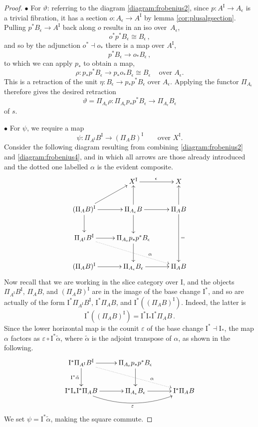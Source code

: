 \documentclass[12pt]{article}
\newcommand{\ra}{\ensuremath{\rightarrow}}
\newcommand{\I}{\ensuremath{\mathrm{I}}}
\theoremstyle{remark}
\theoremstyle{definition}
\begin{document}
\begin{proof}
\noindent $\bullet$ For $\vartheta$: referring to the diagram \eqref{diagram:frobenius2}, since $p : A^\I \ra A_\epsilon$ is a trivial fibration, it has a section $o :  A_\epsilon \ra A^\I$ by lemma \ref{cor:plusalgsection}.  Pulling  $p^*B_\epsilon \ra A^\I$ back along $o$ results in an iso over~$A_\epsilon$,
\[
o^*p^* B_\epsilon \cong B_\epsilon \,,
\]
and so by the adjunction $o^*\!\dashv o_*$ there is a map over $A^\I$,
\[
p^* B_\epsilon \ra o_* B_\epsilon \,,
\]
to which we can apply $p_*$ to obtain a map,
\[
\rho : p_*p^* B_\epsilon \ra p_*o_*B_\epsilon \cong B_\epsilon\,\quad \text{over $A_\epsilon$.}
\]
This is a retraction of the unit $\eta : B_\epsilon \ra p_*p^* B_\epsilon$ over $A_\epsilon$.  Applying the functor $ \Pi_{A_\epsilon}$ therefore gives the desired retraction $$\vartheta = \Pi_{A_\epsilon}\rho :  \Pi_{A_\epsilon}p_*p^* B_\epsilon \ra \Pi_{A_\epsilon}B_\epsilon$$ of $s$.

\medskip
\noindent $\bullet$ For $\psi$, we require a map 
\[
\psi:\Pi_{A^\I}B^\I \ra (\Pi_AB)^\I \qquad \text{over $X^\I$.}
\]
Consider the following diagram resulting from combining \eqref{diagram:frobenius2} and \eqref{diagram:frobenius4}, and in which all arrows are those already introduced and the dotted one labelled $\alpha$ is the evident composite.
\begin{equation}\label{diagram:frobenius8}
\xymatrix{
& X^\I \ar[r]^\epsilon & X \\
 (\Pi_AB)^\I  \ar[r]  \ar[ru] \ar[d] & \Pi_{A_\epsilon}B  \ar[u] \ar[d] \ar[r] & \Pi_{A}B \ar[u]\ar[dd]^= \\
 \Pi_{A^\I}B^\I \ar[r] \ar@{..>}[rrd]^>>>>>>>>>>>\alpha & \Pi_{A_\epsilon} p_*p^* B_\epsilon \ar[d] & \\
  (\Pi_AB)^\I  \ar[r]  & \Pi_{A_\epsilon}B_\epsilon \ar[r] & \Pi_{A}B 
}
\end{equation}
Now recall that we are working in the slice category over $\I$, and the objects  $\Pi_{A^\I}B^\I $, $\Pi_{A}B$, and $(\Pi_AB)^\I $ are in the image of the base change $\I^*$, and so are actually  of the form $\I^*\Pi_{A^\I}B^\I $, $\I^*\Pi_{A}B$, and $\I^*((\Pi_AB)^\I) $.  Indeed, the latter is 
\[
\I^*((\Pi_AB)^\I) = \I^*\I_*\I^*\Pi_AB\,.
\]
Since the lower horizontal map is the counit $\varepsilon$ of the base change $\I^* \dashv \I_*$, the map $\alpha$ factors as $\varepsilon\circ\I^*\tilde{\alpha}$, where $\tilde{\alpha}$ is the adjoint transpose of $\alpha$, as shown in the following.
\begin{equation}\label{diagram:frobenius9}
\xymatrix{
\I^*\Pi_{A^\I}B^\I \ar[d]_{\I^*\tilde{\alpha}} \ar[r] \ar@{..>}[rrd]^>>>>>>>>>>>\alpha & \Pi_{A_\epsilon} p_*p^* B_\epsilon \ar[d] & \\
  \I^*\I_*\I^*\Pi_AB  \ar[r] \ar@/_4ex/ [rr]_\varepsilon & \Pi_{A_\epsilon}B_\epsilon \ar[r] & \I^*\Pi_{A}B 
}
\end{equation}
We set $\psi = \I^*\tilde{\alpha}$, making the square commute.  


\end{proof}
\end{document}
